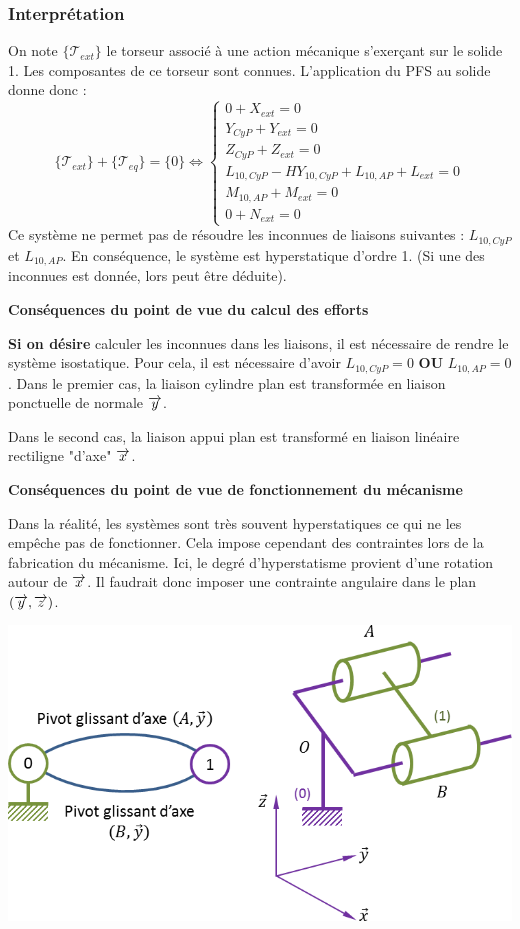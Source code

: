 \documentclass[10pt]{article}
\begin{document}
\subsubsection*{Interprétation}
On note $\{\mathcal{T}_{ext}\}$ le torseur associé à une action mécanique s'exerçant sur le solide 1. Les composantes de ce torseur sont connues. L'application du PFS au solide donne donc :
$$
\{\mathcal{T}_{ext}\} + \{\mathcal{T}_{eq}\}= \{0\} \Longleftrightarrow
\left\{
\begin{array}{l}
{0}+X_{ext}=0 \\
{Y_{CyP}}+Y_{ext}=0 \\
{Z_{CyP}}+Z_{ext}=0 \\
{L_{10,CyP}-HY_{10,CyP}+L_{10,AP}}+L_{ext}=0 \\
{M_{10,AP}}+M_{ext}=0 \\
{0}+N_{ext}=0 
\end{array}
\right.
$$
Ce système ne permet pas de résoudre les inconnues de liaisons suivantes : $L_{10,CyP}$ et $L_{10,AP}$. En conséquence, le système est hyperstatique d'ordre 1. (Si une des inconnues est donnée, lors peut être déduite).

\textbf{Conséquences du point de vue du calcul des efforts}

\textbf{Si on désire} calculer les inconnues dans les liaisons, il est nécessaire de rendre le système isostatique. Pour cela, il est nécessaire d'avoir $L_{10,CyP}=0$ \textbf{OU} $L_{10,AP}=0$. Dans le premier cas, la liaison cylindre plan est transformée en liaison ponctuelle de normale $\overrightarrow{y}$.

Dans le second cas, la liaison appui plan est transformé en liaison linéaire rectiligne "d'axe" $\overrightarrow{x}$.

\textbf{Conséquences du point de vue de fonctionnement du mécanisme}

Dans la réalité, les systèmes sont très souvent hyperstatiques ce qui ne les empêche pas de fonctionner. Cela impose cependant des contraintes lors de la fabrication du mécanisme. Ici, le degré d'hyperstatisme provient d'une rotation autour de $\overrightarrow{x}$. Il faudrait donc imposer une contrainte angulaire dans le plan $\left(\overrightarrow{y},\overrightarrow{z}\right)$.

\begin{exemple}

\begin{center}
\includegraphics[width=.7\textwidth]{images/chs2}
\end{center}
\end{exemple}
\end{document}
